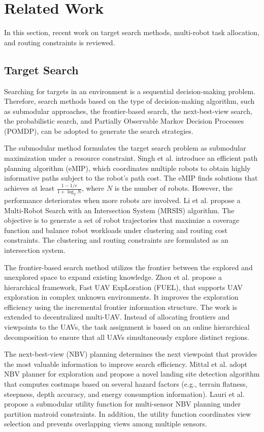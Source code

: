 \chapter{Related Work}
In this section, recent work on target search methods, multi-robot task allocation, and routing constraints is reviewed.

\section{Target Search}
Searching for targets in an environment is a sequential decision-making problem. Therefore, search methods based on the type of decision-making algorithm, such as submodular approaches, the frontier-based search, the next-best-view search, the probabilistic search, and Partially Observable Markov Decision Processes (POMDP), can be adopted to generate the search strategies.

The submodular method formulates the target search problem as submodular maximization under a resource constraint.
Singh et al. \cite{singh2007efficient} introduce an efficient path planning algorithm (eMIP), which coordinates multiple robots to obtain highly informative paths subject to the robot's path cost.
The eMIP finds solutions that achieves at least $\frac{1-1/e}{1+\log_2 N}$, where $N$ is the number of robots.
However, the performance deteriorates when more robots are involved.
Li et al. \cite{li2024mrsis} propose a Multi-Robot Search with an Intersection System (MRSIS) algorithm.
The objective is to generate a set of robot trajectories that maximize a coverage function and balance robot workloads under clustering and routing cost constraints.
The clustering and routing constraints are formulated as an intersection system.

The frontier-based search method utilizes the frontier between the explored and unexplored space to expand existing knowledge.
Zhou et al. \cite{zhou2021fuel} propose a hierarchical framework, Fast UAV ExpLoration (FUEL), that supports UAV exploration in complex unknown environments. It improves the exploration efficiency using the incremental frontier information structure.
The work is extended to decentralized multi-UAV\cite{zhou2023racer}.
Instead of allocating frontiers and viewpoints to the UAVs, the task assignment is based on an online hierarchical decomposition to ensure that all UAVs simultaneously explore distinct regions.

The next-best-view (NBV) planning determines the next viewpoint that provides the most valuable information to improve search efficiency.
Mittal et al. \cite{mittal2019vision} adopt NBV planner for exploration and propose a novel landing site detection algorithm that computes costmaps based on several hazard factors (e.g., terrain flatness, steepness, depth accuracy, and energy consumption information).
Lauri et al. \cite{lauri2020multi} propose a submodular utility function for multi-sensor NBV planning under partition matroid constraints. In addition, the utility function coordinates view selection and prevents overlapping views among multiple sensors.

